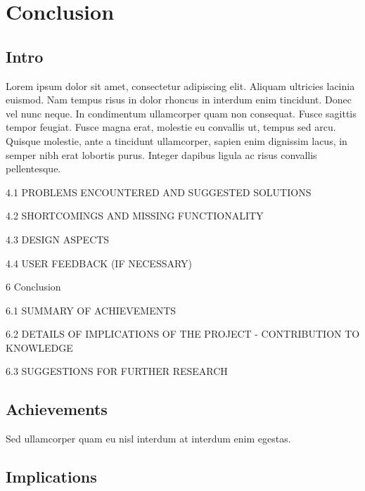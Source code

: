 
\pagestyle{fancy}

\chapter{Conclusion}
\label{Conclusion}


\section{Intro}

Lorem ipsum dolor sit amet, consectetur adipiscing elit. Aliquam ultricies lacinia euismod. Nam tempus risus in dolor rhoncus in interdum enim tincidunt. Donec vel nunc neque. In condimentum ullamcorper quam non consequat. Fusce sagittis tempor feugiat. Fusce magna erat, molestie eu convallis ut, tempus sed arcu. Quisque molestie, ante a tincidunt ullamcorper, sapien enim dignissim lacus, in semper nibh erat lobortis purus. Integer dapibus ligula ac risus convallis pellentesque.

4.1	PROBLEMS ENCOUNTERED AND SUGGESTED SOLUTIONS

4.2	SHORTCOMINGS AND MISSING FUNCTIONALITY

4.3	DESIGN ASPECTS

4.4	USER FEEDBACK (IF NECESSARY)


6	Conclusion

6.1	SUMMARY OF ACHIEVEMENTS

6.2	DETAILS OF IMPLICATIONS OF THE PROJECT - CONTRIBUTION TO KNOWLEDGE

6.3	SUGGESTIONS FOR FURTHER RESEARCH



\section{Achievements}

Sed ullamcorper quam eu nisl interdum at interdum enim egestas.


\section{Implications}

